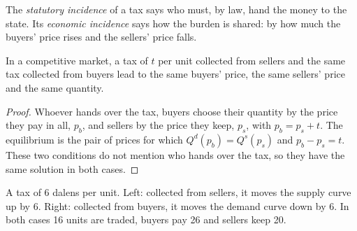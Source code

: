 \begin{definition}\label{def:g10:tax-incidence:statutory}
The \emph{statutory incidence} of a tax says who must, by law, hand the money to the state. Its \emph{economic
incidence} says how the burden is shared: by how much the buyers' price rises and the sellers' price falls.
\end{definition}
\label{def:g10:tax-incidence:economic}

\begin{proposition}\label{prop:g10:tax-incidence:same}
In a competitive market, a tax of $t$ per unit collected from sellers and the same tax collected from buyers lead to the same buyers' price, the same sellers'
price and the same quantity.
\end{proposition}
\begin{proof}
Whoever hands over the tax, buyers choose their quantity by the price they pay in all, $p_b$, and sellers by the price they keep, $p_s$, with $p_b = p_s + t$.
The equilibrium is the pair of prices for which $Q^d(p_b) = Q^s(p_s)$ and $p_b - p_s = t$. These two conditions do not mention who hands over the tax, so
they have the same solution in both cases.
\end{proof}

\begin{omfigure}

{\small A tax of 6 dalens per unit. Left: collected from sellers, it moves the supply curve up by 6. Right: collected from buyers, it moves the demand curve down
by 6. In both cases 16 units are traded, buyers pay 26 and sellers keep 20.}
\end{omfigure}

